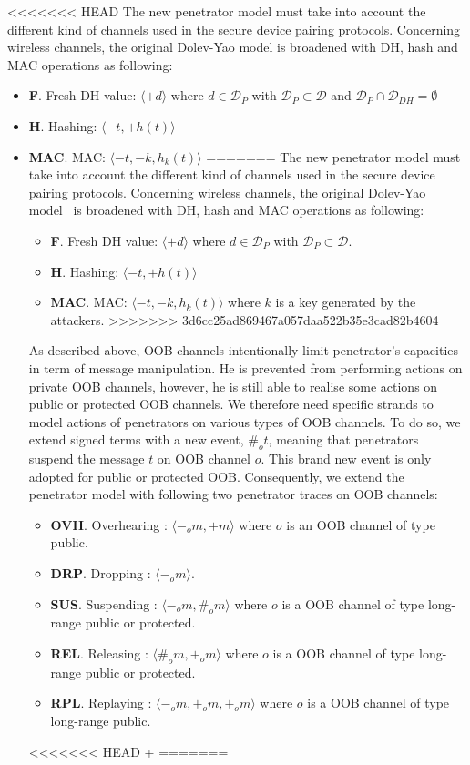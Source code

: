 <<<<<<< HEAD
The new penetrator model must take into account the different kind of channels used in the secure device pairing protocols. Concerning wireless channels, the original Dolev-Yao model is broadened with DH, hash and MAC operations as following:
\begin{itemize}
\item \textbf{F}. Fresh DH value: $\langle +d   \rangle$  where $d \in \mathcal{D}_P$ with $\mathcal{D}_P \subset \mathcal{D}$ and $\mathcal{D}_P \cap \mathcal{D}_{DH}=\emptyset$
\item \textbf{H}. Hashing: $\langle -t,+h(t)   \rangle$  
\item \textbf{MAC}. MAC: $\langle -t,-k, h_k(t)   \rangle$ 
=======
The new penetrator model must take into account the different kind of channels used in the secure device pairing protocols. Concerning wireless channels, the original Dolev-Yao model~\cite{dolev-yao} is broadened with DH, hash and MAC operations as following:
\begin{itemize}
\item \textbf{F}. Fresh DH value: $\langle +d   \rangle$  where $d \in \mathcal{D}_P$ with $\mathcal{D}_P \subset \mathcal{D}$.
\item \textbf{H}. Hashing: $\langle -t,+h(t)   \rangle$  
\item \textbf{MAC}. MAC: $\langle -t,-k, h_k(t)   \rangle$ where $k$ is a key generated by the attackers. 
>>>>>>> 3d6cc25ad869467a057daa522b35e3cad82b4604
\end{itemize} 

As described above, OOB channels intentionally limit penetrator's capacities in term of message manipulation. He is prevented from performing actions on private OOB channels, however, he is still able to realise some actions on public or protected OOB channels. We therefore need specific strands to model actions of penetrators on various types of OOB channels. To do so, we extend signed terms with a new event, $\#_ot$, meaning that penetrators suspend the message $t$ on OOB channel $o$. This brand new event is only adopted for public or protected OOB. Consequently, we extend the penetrator model with following two penetrator traces on OOB channels:

\begin{itemize}
\item \textbf{OVH}. Overhearing : $\langle -_om, +m \rangle$ where $o$ is an OOB channel of type public.
\item \textbf{DRP}. Dropping : $\langle -_om \rangle$.
\item \textbf{SUS}. Suspending : $\langle -_om,\#_om \rangle$ where $o$ is a OOB channel of type long-range public or protected. 
\item \textbf{REL}. Releasing : $\langle \#_om,+_om  \rangle$ where $o$ is a OOB channel of type long-range public or protected.
\item \textbf{RPL}. Replaying : $\langle -_om,+_om,+_om  \rangle$ where $o$ is a OOB channel of type long-range public.
\end{itemize} 
<<<<<<< HEAD
+
=======


\end{itemize}
